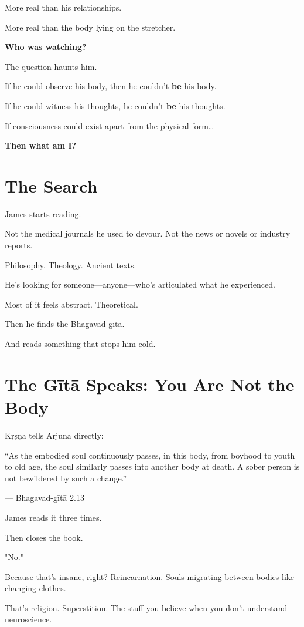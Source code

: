 \documentclass[11pt,twoside]{book}
\begin{document}
More real than his relationships.

More real than the body lying on the stretcher.

\textbf{Who was watching?}

The question haunts him.

If he could observe his body, then he couldn't \textbf{be} his body.

If he could witness his thoughts, he couldn't \textbf{be} his thoughts.

If consciousness could exist apart from the physical form\ldots{}

\textbf{Then what am I?}

\section*{The Search}

James starts reading.

Not the medical journals he used to devour. Not the news or novels or industry reports.

Philosophy. Theology. Ancient texts.

He's looking for someone—anyone—who's articulated what he experienced.

Most of it feels abstract. Theoretical.

Then he finds the Bhagavad-gītā.

And reads something that stops him cold.

\section*{The Gītā Speaks: You Are Not the Body}

Kṛṣṇa tells Arjuna directly:

\begin{pullquote}
``As the embodied soul continuously passes, in this body, from boyhood to youth to old age, the soul similarly passes into another body at death. A sober person is not bewildered by such a change.''

--- Bhagavad-gītā 2.13
\end{pullquote}

James reads it three times.

Then closes the book.

"No."

Because that's insane, right? Reincarnation. Souls migrating between bodies like changing clothes.

That's religion. Superstition. The stuff you believe when you don't understand neuroscience.
\end{document}
